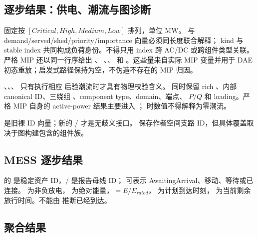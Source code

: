 \subsection{逐步结果：供电、潮流与图诊断}

 固定按 $[Critical,High,Medium,Low]$ 排列，单位 MW。
 与 demand/served/shed/priority/importance 向量必须同长度联合解释；
kind 与 stable index 共同构成负荷身份。不得只用 index 跨 AC/DC 或跨组件类型关联。
严格 MIP 还以同一行序给出 、
、、
 和 。这些量来自实际 MIP
变量并用于 DAE 初态重放；启发式路径保持为空，不伪造不存在的 MIP 归因。

、、、 只有执行相应
后验潮流时才具有物理校验含义。 同时保留 rich
、内部 canonical ID、三绕组 、component type、domain、端点、
$P/Q$ 和 loading。严格 MIP 自身的 active-power 结果主要进入
； 时数值不得解释为零潮流。

 是旧裸 ID 向量；新的
/ 才是无歧义接口。
 保存作者空间支路 ID，但具体覆盖取决于图构建包含的组件族。

\subsection{MESS 逐步结果}

 的  是稳定资产 ID，/ 是报告母线 ID；
 可表示 AwaitingArrival、移动、等待或已连接。 为非负放电，
 为绝对能量，$=E/E_{rated}$， 为计划到达时刻，
 为当前剩余旅行时间。不能由  推断已经到达。

\subsection{聚合结果}

